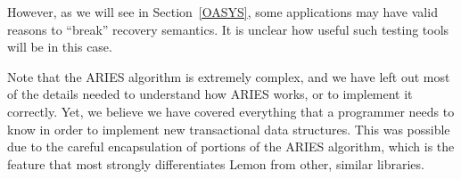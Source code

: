 \documentclass[letterpaper,twocolumn,english]{article}
\newcommand{\yad}{Lemon\xspace}
\begin{document}
However, as we will see in Section~\ref{OASYS}, some applications may
have valid reasons to ``break'' recovery semantics.  It is unclear how
useful such testing tools will be in this case.

Note that the ARIES algorithm is extremely complex, and we have left
out most of the details needed to understand how ARIES works, or to 
implement it correctly.
Yet, we believe we have covered everything that a programmer needs
 to know in order to implement new transactional data structures. 
This was possible due to the careful encapsulation
of portions of the ARIES algorithm, which is the feature that
most strongly differentiates \yad from other, similar libraries.










%
\end{document}
